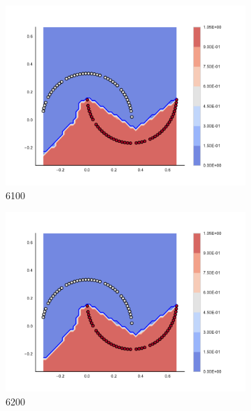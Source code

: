 \begin{figure}[h]
\begin{subfigure}[b]{0.09\textwidth}
    \includegraphics[clip, trim=2.35cm 1.75cm 4.5cm 0cm,width=\textwidth]{img/convergence/6100.pdf}
    \caption{6100}
    \label{fig:convergence_6100}
\end{subfigure}
%
\begin{subfigure}[b]{0.09\textwidth}
    \includegraphics[clip, trim=2.35cm 1.75cm 4.5cm 0cm,width=\textwidth]{img/convergence/6200.pdf}
    \caption{6200}
    \label{fig:convergence_6200}
\end{subfigure}
%
\begin{subfigure}[b]{0.09\textwidth}

\end{subfigure}
\end{figure}

